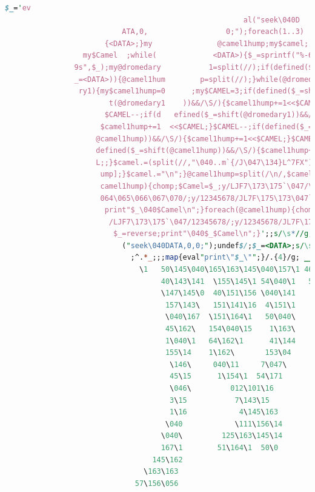 \documentclass{beamer}
\begin{document}
\begin{frame}[fragile]
{\begin{lstlisting}[language=Perl, basicstyle=\tiny]
				                                           $_='ev
				                                       al("seek\040D
				           ATA,0,                  0;");foreach(1..3)
				       {<DATA>;}my               @camel1hump;my$camel;
				  my$Camel  ;while(             <DATA>){$_=sprintf("%-6
				9s",$_);my@dromedary           1=split(//);if(defined($
				_=<DATA>)){@camel1hum        p=split(//);}while(@dromeda
				 ry1){my$camel1hump=0      ;my$CAMEL=3;if(defined($_=shif
				        t(@dromedary1    ))&&/\S/){$camel1hump+=1<<$CAMEL;}
				       $CAMEL--;if(d   efined($_=shift(@dromedary1))&&/\S/){
				      $camel1hump+=1  <<$CAMEL;}$CAMEL--;if(defined($_=shift(
				     @camel1hump))&&/\S/){$camel1hump+=1<<$CAMEL;}$CAMEL--;if(
				     defined($_=shift(@camel1hump))&&/\S/){$camel1hump+=1<<$CAME
				     L;;}$camel.=(split(//,"\040..m`{/J\047\134}L^7FX"))[$camel1h
				      ump];}$camel.="\n";}@camel1hump=split(/\n/,$camel);foreach(@
				      camel1hump){chomp;$Camel=$_;y/LJF7\173\175`\047/\061\062\063\
				      064\065\066\067\070/;y/12345678/JL7F\175\173\047`/;$_=reverse;
				       print"$_\040$Camel\n";}foreach(@camel1hump){chomp;$Camel=$_;y
				        /LJF7\173\175`\047/12345678/;y/12345678/JL7F\175\173\0 47`/;
				         $_=reverse;print"\040$_$Camel\n";}';;s/\s*//g;;eval;   eval
				           ("seek\040DATA,0,0;");undef$/;$_=<DATA>;s/\s*//g;(   );;s
				             ;^.*_;;;map{eval"print\"$_\"";}/.{4}/g; __DATA__   \124
				               \1   50\145\040\165\163\145\040\157\1 46\040\1  41\0
				                    40\143\141  \155\145\1 54\040\1   51\155\  141
				                    \147\145\0  40\151\156 \040\141    \163\16 3\
				                     157\143\   151\141\16  4\151\1     57\156
				                     \040\167  \151\164\1   50\040\      120\1
				                     45\162\   154\040\15    1\163\      040\14
				                     1\040\1   64\162\1      41\144       \145\
				                     155\14    1\162\       153\04        0\157
				                      \146\     040\11     7\047\         122\1
				                      45\15      1\154\1  54\171          \040
				                      \046\         012\101\16            3\16
				                      3\15           7\143\15             1\14
				                      1\16            4\145\163           \054
				                     \040            \111\156\14         3\056
				                    \040\         125\163\145\14         4\040\
				                    167\1        51\164\1  50\0         40\160\
				                  145\162                              \155\151
				                \163\163                                \151\1
				              57\156\056
			\end{lstlisting}}
	\end{frame}
\end{document}
